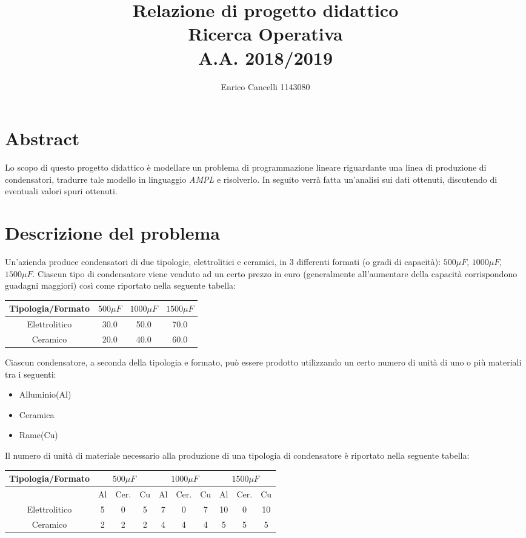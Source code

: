 \documentclass[11pt,a4paper]{article}
\title{
	Relazione di progetto didattico \\
	Ricerca Operativa \\
	A.A. 2018/2019
}
\author{Enrico Cancelli 1143080}
\begin{document}
\maketitle
\newpage
\tableofcontents
\newpage
\section{Abstract}
Lo scopo di questo progetto didattico è modellare un problema di programmazione lineare riguardante una linea di produzione di condensatori, tradurre tale modello in linguaggio \textit{AMPL} e risolverlo. In seguito verrà fatta un'analisi sui dati ottenuti, discutendo di eventuali valori spuri ottenuti.
\section{Descrizione del problema}
Un'azienda produce condensatori di due tipologie, elettrolitici e ceramici, in 3 differenti formati (o gradi di capacità): $500 \mu F$, $1000 \mu F$, $1500 \mu F$.
Ciascun tipo di condensatore viene venduto ad un certo prezzo in euro (generalmente all'aumentare della capacità corrispondono guadagni maggiori) così come riportato nella seguente tabella: \\
\begin{center}
\begin{tabular}{|c|c|c|c|}
 \hline
 Tipologia/Formato & $500 \mu F$ & $1000 \mu F$ & $1500 \mu F$ \\
 \hline
 Elettrolitico  &    30.0     &     50.0     &     70.0     \\
 \hline
 Ceramico       &    20.0     &     40.0     &     60.0     \\
 \hline
\end{tabular}
\end{center}
Ciascun condensatore, a seconda della tipologia e formato, può essere prodotto utilizzando un certo numero di unità di uno o più materiali tra i seguenti:
\begin{itemize}
	\item{Alluminio(Al)}
	\item{Ceramica}
	\item{Rame(Cu)}
\end{itemize}
Il numero di unità di materiale necessario alla produzione di una tipologia di condensatore è riportato nella seguente tabella: \\
\begin{center}
\begin{tabular}{|c|c|c|c|c|c|c|c|c|c|}
\hline
 Tipologia/Formato & \multicolumn{3}{|c|}{$500 \mu F$} & \multicolumn{3}{|c|}{$1000 \mu F$} & \multicolumn{3}{|c|}{$1500 \mu F$} \\
 \hline
                   & Al & Cer. & Cu & Al & Cer. & Cu & Al & Cer. & Cu \\
 \hline
 Elettrolitico     & 5  &    0     &  5 & 7  &     0    & 7  &  10  &     0    & 10  \\
 \hline
 Ceramico          & 2  &    2     &  2 & 4  &    4     & 4  & 5  &      5    & 5  \\
 \hline
\end{tabular}
\end{center}
\end{document}
